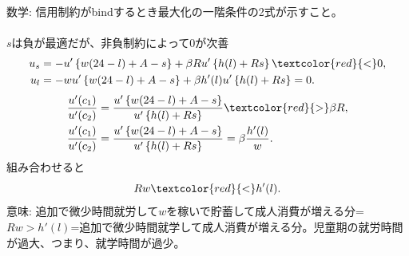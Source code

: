 \begin{frame}[label=FOCsUnderCreditConstraint]{}
数学: 信用制約がbindするとき最大化の一階条件の2式が示すこと。\\~\\
$s$は負が最適だが、非負制約によって0が次善
\[
\begin{aligned}
u_{s}
&=-u'\left\{w(24-l)+A-s\right\}+\beta Ru'\left\{h(l)+Rs\right\}\textcolor{red}{<}0,\\
u_{l}
&=-wu'\left\{w(24-l)+A-s\right\}+\beta h'(l)u'\left\{h(l)+Rs\right\}=0.
\end{aligned}
\]
\[
\begin{aligned}
\frac{u'(c_{1})}{u'(c_{2})}&=\frac{u'\left\{w(24-l)+A-s\right\}}{u'\left\{h(l)+Rs\right\}}\textcolor{red}{>}\beta R,\\
\frac{u'(c_{1})}{u'(c_{2})}&=\frac{u'\left\{w(24-l)+A-s\right\}}{u'\left\{h(l)+Rs\right\}}=\beta \frac{h'(l)}{w}.
\end{aligned}
\]
組み合わせると
\[
Rw\textcolor{red}{<}h'(l).
\]
意味: 追加で微少時間就労して$w$を稼いで貯蓄して成人消費が増える分=$Rw>h'(l)$=追加で微少時間就学して成人消費が増える分。児童期の就労時間が過大、つまり、就学時間が過少。
\end{frame}



